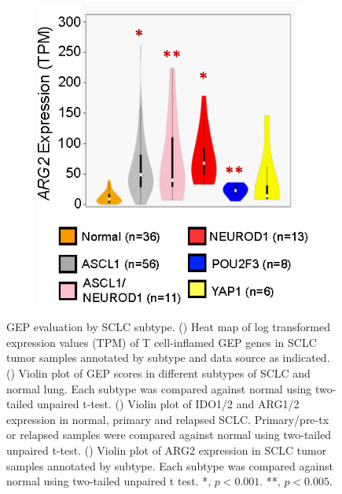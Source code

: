 \begin{figure}[htb]
\begin{subfigure}{0.304\textwidth}
        \caption{}\label{fig:sclc:ido_arg_violin}
    \end{subfigure}%
    \hfill%
    \begin{subfigure}{0.250\textwidth}
        \includegraphics[width=\linewidth,keepaspectratio]{images/sclc/arg2_violin_subtype}
        \caption{}\label{fig:sclc:arg2_violin_subtype}
    \end{subfigure}%
    \hspace{0.08\textwidth}
    
    \vspace{-0.5cm}
    \caption[GEP evaluation by SCLC subtype.]{GEP evaluation by SCLC subtype. () Heat map of log transformed expression values (TPM) of T cell-inflamed GEP genes in SCLC tumor samples annotated by subtype and data source as indicated. () Violin plot of GEP scores in different subtypes of SCLC and normal lung. Each subtype was compared against normal using two-tailed unpaired t-test. () Violin plot of IDO1/2 and ARG1/2 expression in normal, primary and relapsed SCLC\@. Primary/pre-tx or relapsed samples were compared against normal using two-tailed unpaired t-test. () Violin plot of ARG2 expression in SCLC tumor samples annotated by subtype. Each subtype was compared against normal using two-tailed unpaired t test. *, $p<0.001$. **, $p<0.005$.}
    \label{fig:sclc:immune_profiles_subtype}
\end{figure}
